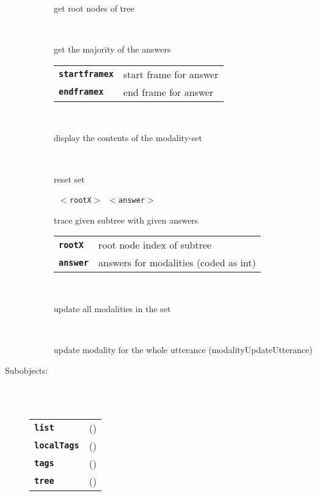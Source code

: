 \begin{description}
\begin{description}
        get root nodes of tree

       \texttt{  } \

        get the majority of the answers

      \begin{tabular}{ll}
 \texttt{\textbf{startframex}} &  start frame for answer  \\
 \texttt{\textbf{endframex}} &    end frame for answer  \\
      \end{tabular}
       \texttt{} \

        display the contents of the modality-set

       \texttt{} \

        reset set

       \texttt{ $<$rootX$>$ $<$answer$>$} \

        trace given subtree with given answers

      \begin{tabular}{ll}
 \texttt{\textbf{rootX}} &   root node index of subtree  \\
 \texttt{\textbf{answer}} &  answers for modalities (coded as int)  \\
      \end{tabular}
       \texttt{} \

        update all modalities in the set

       \texttt{} \

        update modality for the whole utterance (modalityUpdateUtterance)

    \end{description}

  \item[Subobjects:] \hfill \\
\ 
    \begin{tabular}{ll}
      \texttt{\textbf{list}} & (\Jref{module}{List}) \\
      \texttt{\textbf{localTags}} & (\Jref{module}{Tags}) \\
      \texttt{\textbf{tags}} & (\Jref{module}{Tags}) \\
      \texttt{\textbf{tree}} & (\Jref{module}{???}) \\
    \end{tabular}
\vspace{3mm}

\end{description}

